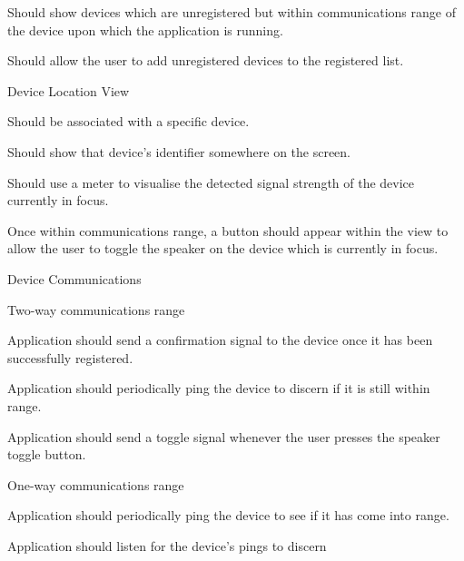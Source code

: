\documentclass[12pt]{article}
\begin{document}
\begin{packed_enum}
\begin{packed_enum}
\begin{packed_enum}
\begin{packed_enum}
          \item Should show devices which are unregistered but within
                communications range of the device upon which the application
                is running.
          \item Should allow the user to add unregistered devices to the
                registered list.
        \end{packed_enum}
        \item Device Location View
        \begin{packed_enum}
          \item Should be associated with a specific device.
          \item Should show that device's identifier somewhere on the screen.
          \item Should use a meter to visualise the detected signal strength of
                the device currently in focus.
          \item Once within communications range, a button should appear within
                the view to allow the user to toggle the speaker on the device
                which is currently in focus.
        \end{packed_enum}
      \end{packed_enum}
      \item Device Communications
      \begin{packed_enum}
        \item Two-way communications range
        \begin{packed_enum}
          \item Application should send a confirmation signal to the device
                once it has been successfully registered.
          \item Application should periodically ping the device to discern if
                it is still within range.
          \item Application should send a toggle signal whenever the user
                presses the speaker toggle button.
        \end{packed_enum}
        \item One-way communications range
        \begin{packed_enum}
          \item Application should periodically ping the device to see if it
                has come into range.
          \item Application should listen for the device's pings to discern

\end{packed_enum}
\end{packed_enum}
\end{packed_enum}
\end{packed_enum}
\end{document}
